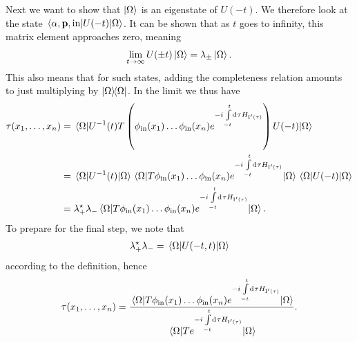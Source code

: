Next we want to show that $\ket{\Omega}$ is an eigenstate of $U(-t)$. We therefore look at the state $\mel{\alpha, \vb{p}, \text{in}}{U(-t)}{\Omega}$. It can be shown that as $t$ goes to infinity, this matrix element approaches zero, meaning
\begin{align*}
	\lim\limits_{t\to\infty}U(\pm t)\ket{\Omega} = \lambda_{\pm}\ket{\Omega}.
\end{align*}
This also means that for such states, adding the completeness relation amounts to just multiplying by $\op{\Omega}$. In the limit we thus have
\begin{align*}
	\tau(x_{1}, \dots, x_{n}) &= \expval{U^{-1}(t)\ensuremath{T}\left(\phi_{\text{in}}(x_{1})\dots \phi_{\text{in}}(x_{n})e^{-i\int\limits_{-t}^{t}\dd[]{\tau}H_{\text{I}\ensuremath{^{\prime}}(\tau)}}\right)U(-t)}{\Omega} \\ 
	                          &=\expval{U^{-1}(t)}{\Omega}\expval{\ensuremath{T}\phi_{\text{in}}(x_{1})\dots \phi_{\text{in}}(x_{n})e^{-i\int\limits_{-t}^{t}\dd[]{\tau}H_{\text{I}\ensuremath{^{\prime}}(\tau)}}}{\Omega}\expval{U(-t)}{\Omega} \\
	                          &= \lambda_{+}^{\star}\lambda_{-}\expval{\ensuremath{T}\phi_{\text{in}}(x_{1})\dots \phi_{\text{in}}(x_{n})e^{-i\int\limits_{-t}^{t}\dd[]{\tau}H_{\text{I}\ensuremath{^{\prime}}(\tau)}}}{\Omega}.
\end{align*}
To prepare for the final step, we note that
\begin{align*}
	\lambda_{+}^{\star}\lambda_{-} = \expval{U(-t, t)}{\Omega}
\end{align*}
according to the definition, hence
\begin{align*}
	\tau(x_{1}, \dots, x_{n}) = \frac{\expval{\ensuremath{T}\phi_{\text{in}}(x_{1})\dots \phi_{\text{in}}(x_{n})e^{-i\int\limits_{-t}^{t}\dd[]{\tau}H_{\text{I}\ensuremath{^{\prime}}(\tau)}}}{\Omega}}{\expval{\ensuremath{T}e^{-i\int\limits_{-t}^{t}\dd[]{\tau}H_{\text{I}\ensuremath{^{\prime}}(\tau)}}}{\Omega}}.
\end{align*}

